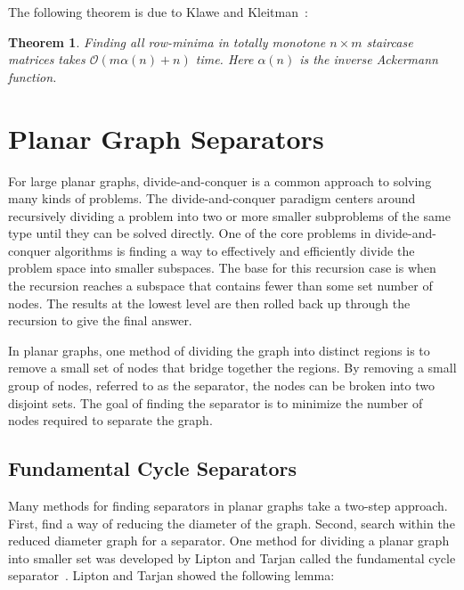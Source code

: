 \documentclass[11pt]{article}
\newtheorem{theorem}{Theorem}[section]
\begin{document}
 The following theorem is due to Klawe and Kleitman~\cite{klawe1990almost}:\\

\begin{theorem}
Finding all row-minima in totally monotone $n\times m$ staircase matrices takes $\mathcal{O}(m\alpha(n)+n)$ time. Here $\alpha(n)$ is the inverse Ackermann function.
\end{theorem}

\section{Planar Graph Separators}
\label{sec:graph-sep}


For large planar graphs, divide-and-conquer is a common approach to solving many kinds of problems. The divide-and-conquer paradigm centers around recursively dividing a problem into two or more smaller subproblems of the same type until they can be solved directly. One of the core problems in divide-and-conquer algorithms is finding a way to effectively and efficiently divide the problem space into smaller subspaces. The base for this recursion case is when the recursion reaches a subspace that contains fewer than some set number of nodes. The results at the lowest level are then rolled back up through the recursion to give the final answer.

In planar graphs, one method of dividing the graph into distinct regions is to remove a small set of nodes that bridge together the regions. By removing a small group of nodes, referred to as the separator, the nodes can be broken into two disjoint sets. The goal of finding the separator is to minimize the number of nodes required to separate the graph.

\subsection{Fundamental Cycle Separators}
\label{sec:graph-sep-fund-cycle-sep}

Many methods for finding separators in planar graphs take a two-step approach. First, find a way of reducing the diameter of the graph. Second, search within the reduced diameter graph for a separator. One method for dividing a planar graph into smaller set was developed by Lipton and Tarjan called the fundamental cycle separator~\cite{lipton1979separator}. Lipton and Tarjan showed the following lemma: \\
\end{document}
